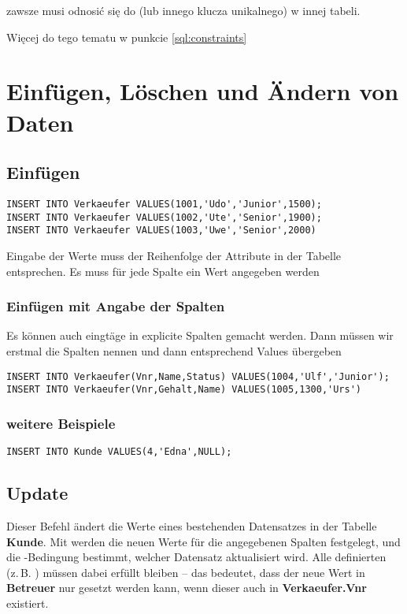 \begin{tcolorbox}[red, title={Hinweis}]
     zawsze musi odnosić się do  (lub innego klucza unikalnego) w innej tabeli.
\end{tcolorbox}

Więcej do tego tematu w punkcie \autoref{sql:constraints}

\section{Einfügen, Löschen und Ändern von Daten}
\subsection{Einfügen}
\begin{lstlisting}[style=sqlstyle]
INSERT INTO Verkaeufer VALUES(1001,'Udo','Junior',1500);
INSERT INTO Verkaeufer VALUES(1002,'Ute','Senior',1900);
INSERT INTO Verkaeufer VALUES(1003,'Uwe','Senior',2000)
\end{lstlisting}

Eingabe der Werte muss der Reihenfolge der Attribute in der Tabelle entsprechen. Es muss für jede Spalte ein Wert angegeben werden

\subsubsection{Einfügen mit Angabe der Spalten}
Es können auch eingtäge in explicite Spalten gemacht werden. Dann müssen wir erstmal die Spalten nennen und dann entsprechend Values übergeben
\begin{lstlisting}[style=sqlstyle]
INSERT INTO Verkaeufer(Vnr,Name,Status) VALUES(1004,'Ulf','Junior');
INSERT INTO Verkaeufer(Vnr,Gehalt,Name) VALUES(1005,1300,'Urs')
\end{lstlisting}

\subsubsection{weitere Beispiele}

\begin{lstlisting}[style=sqlstyle]
INSERT INTO Kunde VALUES(4,'Edna',NULL);
\end{lstlisting}

\subsection{Update}
Dieser Befehl ändert die Werte eines bestehenden Datensatzes in der Tabelle \textbf{Kunde}.  
Mit  werden die neuen Werte für die angegebenen Spalten festgelegt,  
und die -Bedingung bestimmt, welcher Datensatz aktualisiert wird.  
Alle definierten  (z.\,B. ) müssen dabei erfüllt bleiben – 
das bedeutet, dass der neue Wert in \textbf{Betreuer} nur gesetzt werden kann, 
wenn dieser auch in \textbf{Verkaeufer.Vnr} existiert.

